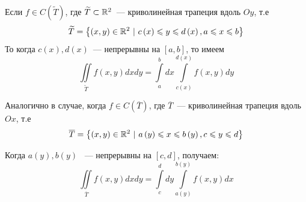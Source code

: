\documentclass[../../main.tex]{subfiles}
\begin{document}
\begin{crl}
	Если $ f \in C \left( \widetilde{T} \right) $, 
	где $ \widetilde{T} \subset \mathbb{R}^2 $~---  
	криволинейная трапеция вдоль $ Oy $, т.е 
	\begin{equation}
	\label{lec_13, num_19}
	\widetilde{T} = \left\lbrace 
	\left( x, y\right) \in \mathbb{R}^2\ | 
	\ c \left( x \right) \leqslant y \leqslant d \left( x \right),
	 a \leqslant x \leqslant b \right\rbrace
	 \end{equation}
	 То когда $c \left( x \right), d \left( x \right) $~---  непрерывны на 
	 $ \left[ a, b \right] $, то имеем
	 \begin{equation}
	 \label{lec_13, num_20}
	 \iint\limits_{\widetilde{T}} f \left( x, y \right)  dxdy = 
	 \int\limits_a^b dx \int\limits_{c \left( x \right) }^{d \left( x \right)} 
	 f \left( x, y \right) dy
	 \end{equation}
	 
	 Аналогично в случае, когда $ f \in C \left( \overline{T} \right) $, 
	 где $ \overline{T} $~---  криволинейная трапеция вдоль $ Ox $, т.е 
	 \begin{equation}
	 \label{lec_13, num_21}
	 \overline{T} = \left\lbrace 
	 \left( x, y\right) \in \mathbb{R}^2\ | 
	 \ a \left( y \right) \leqslant x \leqslant b \left( y \right),
	 c \leqslant y \leqslant d \right\rbrace
	 \end{equation}
	 
	 Когда $ a \left( y \right), b \left( y \right) $
	 ~--- непрерывны на $ \left[ c, d \right] $, получаем:
	 \begin{equation}
	 \label{lec_13, num_22}
	 \iint\limits_{\overline{T}} f \left( x, y \right) dx dy = 
	 \int\limits_c^d dy 
	 \int\limits_{a \left( y \right) } ^ 
	 {b \left( y \right) } f \left( x, y \right) dx
	 \end{equation}
\end{crl}
\end{document}
